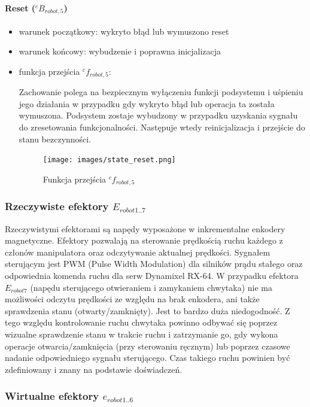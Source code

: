 \documentclass[a4paper, 12pt, twoside]{article}
\begin{document}
\paragraph{Reset ($^cB_{robot,5}$)}

\begin{itemize}
\item warunek początkowy: wykryto błąd lub wymuszono reset
\item warunek końcowy: wybudzenie i poprawna inicjalizacja
\item funkcja przejścia $^cf_{robot,5}$:

Zachowanie polega na bezpiecznym wyłączeniu funkcji podsystemu i uśpieniu jego działania w przypadku gdy wykryto błąd lub operacja ta została wymuszona. Podsystem zostaje wybudzony w przypadku uzyskania sygnału do zresetowania funkcjonalności. Następuje wtedy reinicjalizacja i przejście do stanu bezczynności.

\begin{figure}[hbt!]
\centering
\texttt{[image: images/state\_reset.png]}
\caption{Funkcja przejścia $^cf_{robot,5}$ }
\label{fig:state_reset}
\end{figure}

\end{itemize}

\subsubsection{Rzeczywiste efektory $E_{robot1..7}$}

Rzeczywistymi efektorami są napędy wyposażone w inkrementalne enkodery magnetyczne. Efektory pozwalają na sterowanie prędkością ruchu każdego z członów manipulatora oraz odczytywanie aktualnej prędkości. Sygnałem sterującym jest PWM (Pulse Width Modulation) dla silników prądu stałego oraz odpowiednia komenda ruchu dla serw Dynamixel RX-64. W przypadku efektora $E_{robot7}$ (napędu sterującego otwieraniem i zamykaniem chwytaka) nie ma możliwości odczytu prędkości ze względu na brak enkodera, ani także sprawdzenia stanu (otwarty/zamknięty). Jest to bardzo duża niedogodność. Z tego względu kontrolowanie ruchu chwytaka powinno odbywać się poprzez wizualne sprawdzenie stanu w trakcie ruchu i zatrzymanie go, gdy wykona operacje otwarcia/zamknięcia (przy sterowaniu ręcznym) lub poprzez czasowe nadanie odpowiedniego sygnału sterującego. Czas takiego ruchu powinien być zdefiniowany i znany na podstawie doświadczeń.

\subsubsection{Wirtualne efektory $e_{robot1..6}$}
\end{document}
